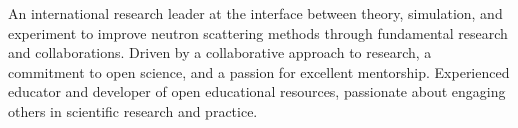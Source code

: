 \vspace{0.25cm}

\begin{cvparagraph}

An international research leader at the interface between theory, simulation, and experiment to improve neutron scattering methods through fundamental research and collaborations.
Driven by a collaborative approach to research, a commitment to open science, and a passion for excellent mentorship.
Experienced educator and developer of open educational resources, passionate about engaging others in scientific research and practice.
\end{cvparagraph}
